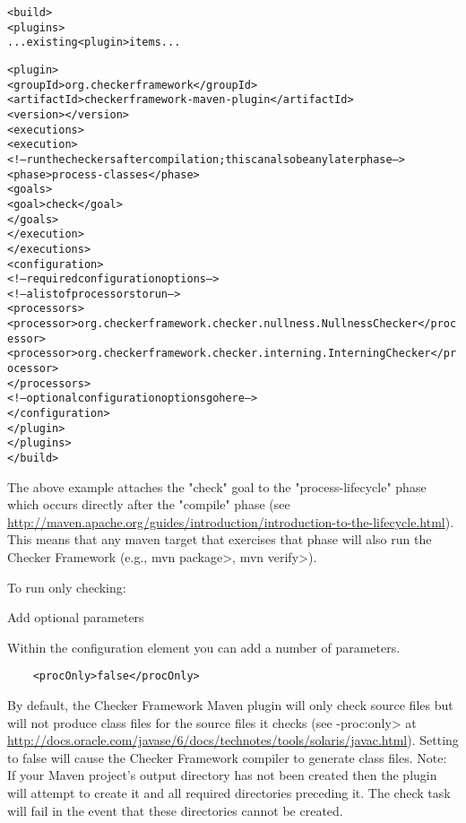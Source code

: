 \begin{enumerate}
{\begin{alltt}
    <build>
        <plugins>
            ... existing <plugin> items ...

            <plugin>
                <groupId>org.checkerframework</groupId>
                <artifactId>checkerframework-maven-plugin</artifactId>
                <version>\ReleaseVersion{}</version>
                <executions>
                    <execution>
                        <!-- run the checkers after compilation; this can also be any later phase -->
                        <phase>process-classes</phase>
                        <goals>
                            <goal>check</goal>
                        </goals>
                    </execution>
                </executions>
                <configuration>
                    <!-- required configuration options -->
                    <!-- a list of processors to run -->
                    <processors>
                        <processor>org.checkerframework.checker.nullness.NullnessChecker</processor>
                        <processor>org.checkerframework.checker.interning.InterningChecker</processor>
                    </processors>
                    <!-- optional configuration options go here -->
                </configuration>
              </plugin>
        </plugins>
    </build>
\end{alltt}

The above example attaches the "check" goal to the "process-lifecycle" phase which occurs directly after
the "compile" phase (see \url{http://maven.apache.org/guides/introduction/introduction-to-the-lifecycle.html}).
This means that any maven target that exercises that phase will also run the Checker Framework
(e.g., \<mvn package>, \<mvn verify>).

To run only checking:

\item Add optional parameters

Within the configuration element you can add a number of parameters.

\begin{Verbatim}
    <procOnly>false</procOnly>
\end{Verbatim}
By default, the Checker Framework Maven plugin will only check source files but will not produce
class files for the source files it checks (see \<-proc:only> at \url{http://docs.oracle.com/javase/6/docs/technotes/tools/solaris/javac.html}).
Setting  to false will cause the Checker Framework compiler to generate class files.
Note: If your Maven project's output directory has not been created then the plugin will attempt to
create it and all required directories preceding it.  The check task will fail
in the event that these directories cannot be created.

}
\end{enumerate}
